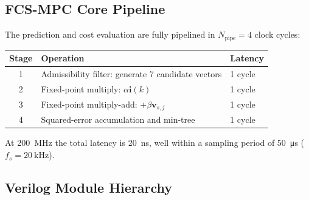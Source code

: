 \documentclass[11pt,a4paper]{article}
\begin{document}
\subsection{FCS-MPC Core Pipeline}
\label{sec:pipeline}

The prediction and cost evaluation are fully pipelined in
$N_{\mathrm{pipe}} = 4$ clock cycles:

\begin{center}
\begin{tabular}{cll}
  \toprule
  Stage & Operation & Latency \\
  \midrule
  1 & Admissibility filter: generate 7 candidate vectors & 1 cycle \\
  2 & Fixed-point multiply: $\alpha\bm{i}(k)$ & 1 cycle \\
  3 & Fixed-point multiply-add: $+\beta\bm{v}_{s,j}$ & 1 cycle \\
  4 & Squared-error accumulation and min-tree & 1 cycle \\
  \bottomrule
\end{tabular}
\end{center}

At \SI{200}{\MHz} the total latency is \SI{20}{\nano\second}, well within
a sampling period of \SI{50}{\micro\second} ($f_s = \SI{20}{\kHz}$).

\subsection{Verilog Module Hierarchy}
\label{sec:modules}
\end{document}
